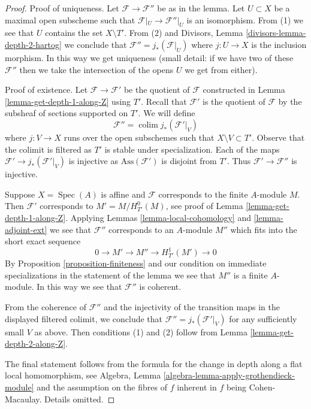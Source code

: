 \documentclass{stacks-project}
\theoremstyle{plain}
\theoremstyle{definition}
\theoremstyle{remark}
\numberwithin{equation}{subsection}
\def\colim{\mathop{\mathrm{colim}}\nolimits}
\def\Spec{\mathop{\mathrm{Spec}}}
\begin{document}
\begin{proof}
Proof of uniqueness. Let $\mathcal{F} \to \mathcal{F}''$
be as in the lemma. Let $U \subset X$ be a maximal open
subscheme such that $\mathcal{F}|_U \to \mathcal{F}''|_U$
is an isomorphism. From (1) we see that $U$ contains the set $X \setminus T'$.
From (2) and Divisors, Lemma \ref{divisors-lemma-depth-2-hartog}
we conclude that $\mathcal{F}'' = j_*(\mathcal{F}|_U)$ where $j : U \to X$
is the inclusion morphism.
In this way we get uniqueness (small detail: if we have two
of these $\mathcal{F}''$ then we take the intersection of the opens $U$
we get from either).

\medskip\noindent
Proof of existence. Let $\mathcal{F} \to \mathcal{F}'$ be the quotient of
$\mathcal{F}$ constructed in Lemma \ref{lemma-get-depth-1-along-Z} using $T'$.
Recall that $\mathcal{F}'$ is the quotient of $\mathcal{F}$
by the subsheaf of sections supported on $T'$. We will define
$$
\mathcal{F}'' = \colim j_*(\mathcal{F}'|_V)
$$
where $j : V \to X$ runs over the open subschemes such that
$X \setminus V \subset T'$. Observe that the colimit is filtered
as $T'$ is stable under specialization. Each of the
maps $\mathcal{F}' \to j_*(\mathcal{F}'|_V)$ is injective
as $\text{Ass}(\mathcal{F}')$ is disjoint from $T'$.
Thus $\mathcal{F}' \to \mathcal{F}''$ is injective.

\medskip\noindent
Suppose $X = \Spec(A)$ is affine and $\mathcal{F}$
corresponds to the finite $A$-module $M$. Then $\mathcal{F}'$
corresponds to $M' = M / H^0_{T'}(M)$, see proof of
Lemma \ref{lemma-get-depth-1-along-Z}. Applying
Lemmas \ref{lemma-local-cohomology} and \ref{lemma-adjoint-ext}
we see that $\mathcal{F}''$ corresponds to an $A$-module
$M''$ which fits into the short exact sequence
$$
0 \to M' \to M'' \to H^1_{T'}(M') \to 0
$$
By Proposition \ref{proposition-finiteness} and our condition
on immediate specializations in the statement of the lemma
we see that $M''$ is a finite $A$-module. In this way
we see that $\mathcal{F}''$ is coherent.

\medskip\noindent
From the coherence of $\mathcal{F}''$ and the injectivity of the transition
maps in the displayed filtered colimit, we conclude that
$\mathcal{F}'' = j_*(\mathcal{F}'|_V)$ for any sufficiently small $V$ as above.
Then conditions (1) and (2) follow from Lemma \ref{lemma-get-depth-2-along-Z}.

\medskip\noindent
The final statement follows from the formula for the change in
depth along a flat local homomorphism, see
Algebra, Lemma \ref{algebra-lemma-apply-grothendieck-module}
and the assumption on the fibres of $f$ inherent in $f$ being
Cohen-Macaulay. Details omitted.
\end{proof}
\end{document}

